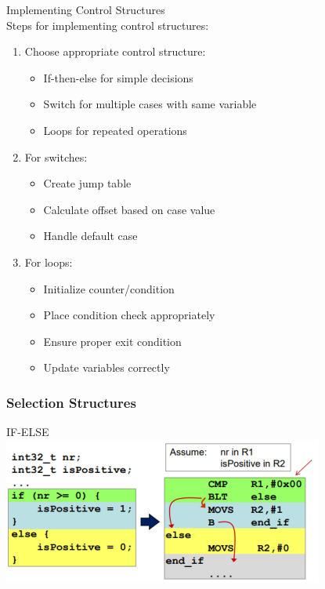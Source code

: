 \begin{KR}{Implementing Control Structures}\\
Steps for implementing control structures:
\begin{enumerate}
  \item Choose appropriate control structure:
    \begin{itemize}
      \item If-then-else for simple decisions
      \item Switch for multiple cases with same variable
      \item Loops for repeated operations
    \end{itemize}
  \item For switches:
    \begin{itemize}
      \item Create jump table
      \item Calculate offset based on case value
      \item Handle default case
    \end{itemize}
  \item For loops:
    \begin{itemize}
      \item Initialize counter/condition
      \item Place condition check appropriately
      \item Ensure proper exit condition
      \item Update variables correctly
    \end{itemize}
\end{enumerate}
\end{KR}

\columnbreak

\subsubsection{Selection Structures}

\begin{definition}{IF-ELSE}\\
    \includegraphics[width=\linewidth]{images/if-else.png}
\end{definition}

